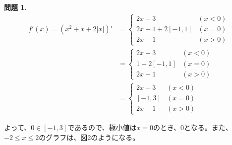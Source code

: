 \documentclass[titlepage]{jsarticle}
\theoremstyle{definition}
\newtheorem{Ex}{問題}
\theoremstyle{mystyle} %
\begin{document}
\begin{Ex}
\begin{equation*}
\begin{split}
f'(x)=(x^2+x+2|x|)' & =
  \begin{cases}
  2x+3 &  (x<0)\\
  2x+1+2[-1, 1] &  (x=0)\\
  2x-1 & (x>0)
  \end{cases}
 \\
 & =
  \begin{cases}
  2x+3 &  (x<0)\\
  1+2[-1, 1] &  (x=0)\\
  2x-1 & (x>0)
  \end{cases}
\\
 & =
  \begin{cases}
  2x+3 &  (x<0)\\
  [-1, 3] &  (x=0)\\
  2x-1 & (x>0)
  \end{cases}
\end{split}
\end{equation*}

よって、$0\in[-1, 3]$であるので、極小値は$x=0$のとき、$0$となる。また、$-2\leq x \leq2$のグラフは、図2のようになる。


\end{Ex}
\end{document}
